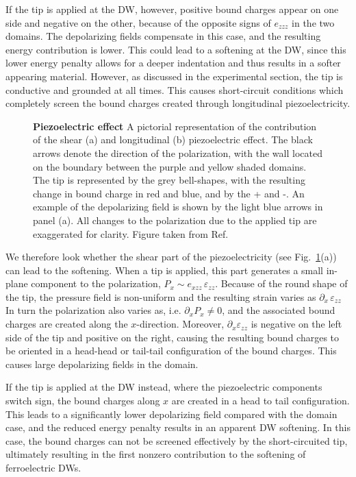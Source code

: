If the tip is applied at the DW, however, positive bound charges appear on one side and negative on the other, because of the opposite signs of $e_{zzz}$ in the two domains.
The depolarizing fields compensate in this case, and the resulting energy contribution is lower.
This could lead to a softening at the DW, since this lower energy penalty allows for a deeper indentation and thus results in a softer appearing material.
However, as discussed in the experimental section, the tip is conductive and grounded at all times.
This causes short-circuit conditions which completely screen the bound charges created through longitudinal piezoelectricity.
\begin{figure}[h]
	\caption{\label{fig:BTO_depolarizing}{\bf Piezoelectric effect} A pictorial representation of the contribution of the shear (a) and longitudinal (b) piezoelectric effect. The black arrows denote the direction of the polarization, with the wall located on the boundary between the purple and yellow shaded domains. The tip is represented by the grey bell-shapes, with the resulting change in bound charge in red and blue, and by the + and -. An example of the depolarizing field is shown by the light blue arrows in panel (a). All changes to the polarization due to the applied tip are exaggerated for clarity. Figure taken from Ref.~\cite{Stefani2020}}
\end{figure}

We therefore look whether the shear part of the piezoelectricity (see Fig.~\ref{fig:BTO_depolarizing}(a)) can lead to the softening.
When a tip is applied, this part generates a small in-plane component to the polarization, $P_x \sim e_{xzz}\,\varepsilon_{zz}$.
Because of the round shape of the tip, the pressure field is non-uniform and the resulting strain varies as $\partial_x\,\varepsilon_{zz}$
In turn the polarization also varies as, i.e. $\partial_x P_x\neq 0$, and the associated bound charges are created along the $x$-direction.
Moreover, $\partial_x \varepsilon_{zz}$ is negative on the left side of the tip and positive on the right, causing the resulting bound charges to be oriented in a head-head or tail-tail configuration of the bound charges.
This causes large depolarizing fields in the domain.

If the tip is applied at the DW instead, where the piezoelectric components switch sign, the bound charges along $x$ are created in a head to tail configuration.
This leads to a significantly lower depolarizing field compared with the domain case, and the reduced energy penalty results in an apparent DW softening.
In this case, the bound charges can not be screened effectively by the short-circuited tip, ultimately resulting in the first nonzero contribution to the softening of ferroelectric DWs. 

